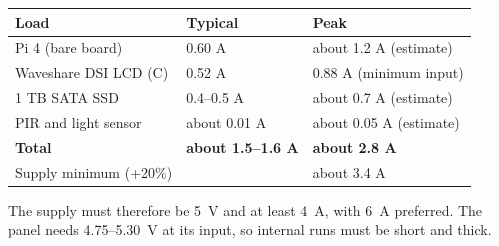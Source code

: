 \documentclass[11pt,a4paper]{article}
\begin{document}
\begin{tabular}{lll}
\toprule
\textbf{Load} & \textbf{Typical} & \textbf{Peak} \\
\midrule
Pi 4 (bare board) & 0.60 A & about 1.2 A (estimate) \\
Waveshare DSI LCD (C) & 0.52 A & 0.88 A (minimum input) \\
1 TB SATA SSD & 0.4--0.5 A & about 0.7 A (estimate) \\
PIR and light sensor & about 0.01 A & about 0.05 A (estimate) \\
\midrule
\textbf{Total} & \textbf{about 1.5--1.6 A} & \textbf{about 2.8 A} \\
Supply minimum (+20\%) & & about 3.4 A \\
\bottomrule
\end{tabular}

The supply must therefore be 5~V and at least 4~A, with 6~A preferred. The panel needs 4.75--5.30~V at its input, so internal runs must be short and thick.
\end{document}
